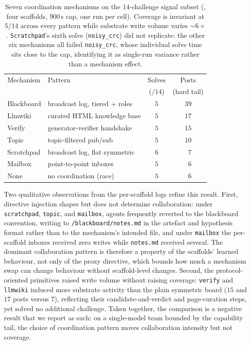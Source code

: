\begin{table}[t]
\centering
\footnotesize
\setlength{\tabcolsep}{4pt}
\begin{tabular*}{\columnwidth}{@{\extracolsep{\fill}}llcc@{}}
\toprule
Mechanism & Pattern & Solves & Posts \\
          &         & ($/14$) & (hard tail) \\
\midrule
\textcolor{cai_primary}{Blackboard} & broadcast log, tiered + roles & $5$ & $39$ \\
\textcolor{cai_primary}{Llmwiki}    & curated HTML knowledge base   & $5$ & $17$ \\
\textcolor{cai_primary}{Verify}     & generator-verifier handshake  & $5$ & $15$ \\
\textcolor{cai_primary}{Topic}      & topic-filtered pub/sub        & $5$ & $10$ \\
\textcolor{cai_primary}{Scratchpad} & broadcast log, flat symmetric & $6$ & $\phantom{0}7$ \\
\textcolor{cai_primary}{Mailbox}    & point-to-point inboxes        & $5$ & $\phantom{0}6$ \\
\textcolor{cai_primary}{None}       & no coordination (race)        & $5$ & $\phantom{0}6$ \\
\bottomrule
\end{tabular*}
\caption{Seven coordination mechanisms on the $14$-challenge signal subset (\aliasmini{}, four scaffolds, $900$\,s cap, one run per cell). Coverage is invariant at $5/14$ across every pattern while substrate write volume varies $\sim 6\times$. \texttt{Scratchpad}'s sixth solve (\texttt{noisy\_crc}) did not replicate: the other six mechanisms all failed \texttt{noisy\_crc}, whose individual solve time sits close to the cap, identifying it as single-run variance rather than a mechanism effect.}\label{tab:primitives}
\end{table}

Two qualitative observations from the per-scaffold logs refine this result. First, directive injection shapes but does not determine collaboration: under \texttt{scratchpad}, \texttt{topic}, and \texttt{mailbox}, agents frequently reverted to the blackboard convention, writing to \texttt{/blackboard/notes.md} in the artefact and hypothesis format rather than to the mechanism's intended file, and under \texttt{mailbox} the per-scaffold inboxes received zero writes while \texttt{notes.md} received several. The dominant collaboration pattern is therefore a property of the scaffolds' learned behaviour, not only of the proxy directive, which bounds how much a mechanism swap can change behaviour without scaffold-level changes. Second, the protocol-oriented primitives raised write volume without raising coverage: \texttt{verify} and \texttt{llmwiki} induced more substrate activity than the plain symmetric board ($15$ and $17$ posts versus $7$), reflecting their candidate-and-verdict and page-curation steps, yet solved no additional challenge. Taken together, the comparison is a negative result that we report as such: on a single-model team bounded by the capability tail, the choice of coordination pattern moves collaboration intensity but not coverage.
\fi

